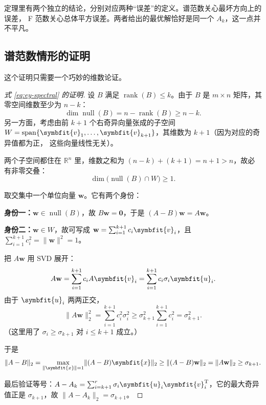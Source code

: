 \documentclass[UTF8, 11pt, a4paper, fontset=windows]{ctexart}
\theoremstyle{cnthm}
\theoremstyle{cndef}
\newcommand{\T}{^{\mathrm{T}}}
\newcommand{\R}{\mathbb{R}}
\newcommand{\nrm}[1]{\lVert #1 \rVert}
\DeclareMathOperator{\rank}{rank}
\DeclareMathOperator{\Span}{span}
\DeclareMathOperator{\Null}{null}
\newcommand{\bu}{\symbfit{u}}
\newcommand{\x}{\symbfit{x}}
\newcommand{\vv}{\symbfit{v}}
\begin{document}
定理里有两个独立的结论，分别对应两种“误差”的定义。谱范数关心最坏方向上的误差，
F 范数关心总体平方误差。两者给出的最优解恰好是同一个 $A_k$，这一点并不平凡。

\subsection{谱范数情形的证明}

这个证明只需要一个巧妙的维数论证。

\begin{proof}[式 \eqref{eq:ey-spectral} 的证明]
设 $B$ 满足 $\rank(B)\le k$。由于 $B$ 是 $m\times n$ 矩阵，其零空间维数至少为 $n-k$：
\begin{equation}
  \dim\Null(B)=n-\rank(B)\ge n-k .
\end{equation}
另一方面，考虑由前 $k+1$ 个右奇异向量张成的子空间
$W=\Span\{\vv_1,\dots,\vv_{k+1}\}$，其维数为 $k+1$（因为对应的奇异值都为正，
这些向量线性无关）。

两个子空间都住在 $\R^n$ 里，维数之和为
$(n-k)+(k+1)=n+1>n$，故必有非零交叠：
\begin{equation}
  \dim\big(\Null(B)\cap W\big)\ge 1 .
\end{equation}

取交集中一个单位向量 $\mathbf{w}$。它有两个身份：

\textbf{身份一：}$\mathbf{w}\in\Null(B)$，故 $B\mathbf{w}=\mathbf{0}$，于是
$(A-B)\mathbf{w}=A\mathbf{w}$。

\textbf{身份二：}$\mathbf{w}\in W$，故可写成
$\mathbf{w}=\sum_{i=1}^{k+1}c_i\vv_i$，且 $\sum_{i=1}^{k+1}c_i^2=\nrm{\mathbf{w}}^2=1$。

把 $A\mathbf{w}$ 用 SVD 展开：
\begin{equation}
  A\mathbf{w}=\sum_{i=1}^{k+1}c_iA\vv_i=\sum_{i=1}^{k+1}c_i\sigma_i\bu_i .
\end{equation}
由于 $\bu_i$ 两两正交，
\begin{equation}
  \nrm{A\mathbf{w}}_2^2=\sum_{i=1}^{k+1}c_i^2\sigma_i^2
  \ge\sigma_{k+1}^2\sum_{i=1}^{k+1}c_i^2=\sigma_{k+1}^2 .
\end{equation}
（这里用了 $\sigma_i\ge\sigma_{k+1}$ 对 $i\le k+1$ 成立。）

于是
\begin{equation}
  \nrm{A-B}_2=\max_{\nrm{\x}=1}\nrm{(A-B)\x}_2
  \ge\nrm{(A-B)\mathbf{w}}_2=\nrm{A\mathbf{w}}_2\ge\sigma_{k+1} .
\end{equation}

最后验证等号：$A-A_k=\sum_{i=k+1}^{r}\sigma_i\bu_i\vv_i\T$，它的最大奇异值正是
$\sigma_{k+1}$，故 $\nrm{A-A_k}_2=\sigma_{k+1}$。
\end{proof}
\end{document}
